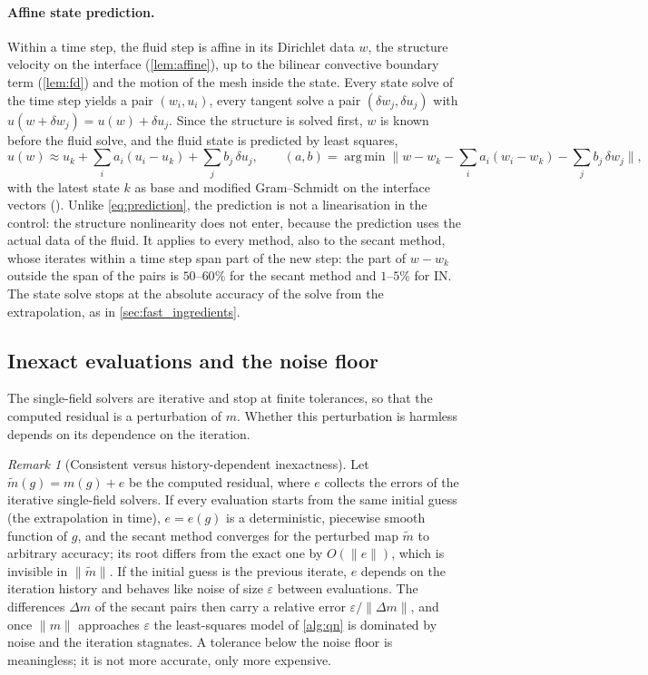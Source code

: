 \documentclass[11pt,a4paper]{article}
\theoremstyle{definition}
\theoremstyle{remark}
\newtheorem{remark}[proposition]{Remark}
\begin{document}
\paragraph{Affine state prediction.} Within a time step, the fluid step is affine in its Dirichlet
data $w$, the structure velocity on the interface (\cref{lem:affine}), up to the bilinear
convective boundary term (\cref{lem:fd}) and the motion of the mesh inside the state. Every state
solve of the time step yields a pair $(w_i,u_i)$, every tangent solve a pair $(\delta w_j,\delta
u_j)$ with $u(w+\delta w_j)=u(w)+\delta u_j$. Since the structure is solved first, $w$ is known
before the fluid solve, and the fluid state is predicted by least squares,
\begin{equation}\label{eq:affine_prediction}
  u(w)\approx u_k+\sum_i a_i(u_i-u_k)+\sum_j b_j\,\delta u_j,\qquad
  (a,b)=\operatorname*{arg\,min}\Big\|w-w_k-\sum_ia_i(w_i-w_k)-\sum_jb_j\,\delta w_j\Big\|,
\end{equation}
with the latest state $k$ as base and modified Gram--Schmidt on the interface vectors
(). Unlike \eqref{eq:prediction}, the prediction is not a linearisation
in the control: the structure nonlinearity does not enter, because the prediction uses the actual
data of the fluid. It applies to every method, also to the secant method, whose iterates within a
time step span part of the new step: the part of $w-w_k$ outside the span of the pairs is $50$--$60\%$
for the secant method and $1$--$5\%$ for IN. The state solve stops at the absolute accuracy of the
solve from the extrapolation, as in \cref{sec:fast_ingredients}.

\subsection{Inexact evaluations and the noise floor}\label{sec:noise}

The single-field solvers are iterative and stop at finite tolerances, so that the computed residual is a perturbation of $m$. Whether this perturbation is harmless depends on its dependence on the iteration.

\begin{remark}[Consistent versus history-dependent inexactness]\label{rem:noise}
Let $\tilde m(g)=m(g)+e$ be the computed residual, where $e$ collects the errors of the iterative
single-field solvers. If every evaluation starts from the same initial guess (the extrapolation in
time), $e=e(g)$ is a deterministic, piecewise smooth function of $g$, and the secant method
converges for the perturbed map $\tilde m$ to arbitrary accuracy; its root differs from the exact
one by $O(\|e\|)$, which is invisible in $\|\tilde m\|$. If the initial guess is the previous
iterate, $e$ depends on the iteration history and behaves like noise of size $\varepsilon$
between evaluations. The differences $\Delta m$ of the secant pairs then carry a relative error
$\varepsilon/\|\Delta m\|$, and once $\|m\|$ approaches $\varepsilon$ the least-squares model of
\cref{alg:qn} is dominated by noise and the iteration stagnates. A tolerance below the noise floor
is meaningless; it is not more accurate, only more expensive.
\end{remark}
\end{document}
